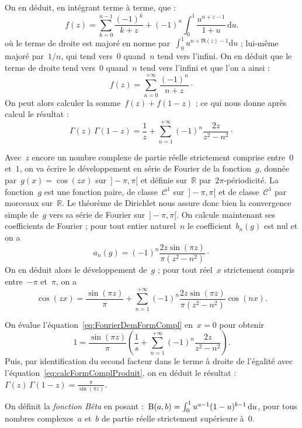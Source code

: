 \begin{dem}
			On en déduit, en intégrant terme à terme, que :
			\[
				f(z) = \sum_{k=0}^{n-1} \frac{(-1)^k}{k+z} + 
							(-1)^n\int_{0}^{1} \frac{u^{n+z-1}}{1+u}\,\mathrm{d}u.
			\]
			où le terme de droite est majoré en norme par~$\int_{0}^{1}u^{n+\Re(z)-1}\mathrm{d}u$ ; lui-même majoré par~$1/n$, qui tend vers~$0$ quand~$n$ tend vers l'infini. On en déduit que le terme de droite tend vers~$0$ quand~$n$ tend vers l'infini et que l'on a ainsi :
			\[
				f(z) = \sum_{n=0}^{+\infty} \frac{(-1)^n}{n+z}\cdot
			\]
			On peut alors calculer la somme~$f(z)+f(1-z)$ ; ce qui nous donne après calcul le résultat :
			\begin{equation}	\label{eq:calcFormComplProduit}
				\Gamma(z)\,\Gamma(1-z) = \frac{1}{z} + \sum_{n=1}^{+\infty} (-1)^n\frac{2 z}{z^2-n^2}\cdot
			\end{equation}
			
			 Avec~$z$ encore un nombre complexe de partie réelle strictement comprise entre~$0$ et~$1$, on va écrire le développement en série de Fourier de la fonction~$g$, donnée par~$g(x)=\cos(zx)$ sur~$]-\pi,\pi[$ et définie sur~$\mathbb{R}$ par~$2\pi$-périodicité. La fonction~$g$ est une fonction paire, de classe~$\mathscr{C}^1$ sur~$]-\pi,\pi[$ et de classe~$\mathscr{C}^1$ par morceaux sur~$\mathbb{R}$. Le théorème de Dirichlet nous assure donc bien la convergence simple de~$g$ vers sa série de Fourier sur~$]-\pi,\pi[$. On calcule maintenant ses coefficients de Fourier ; pour tout entier naturel~$n$ le coefficient~$b_n(g)$ est nul et on a 
			\[
				a_n(g) = (-1)^n\frac{2z\sin(\pi z)}{\pi(z^2-n^2)}\cdot
			\]
			On en déduit alors le développement de~$g$ ; pour tout réel~$x$ strictement compris entre~$-\pi$ et~$\pi$, on a 
			\begin{equation}	\label{eq:FourierDemFormCompl}
				\cos(zx) = \frac{\sin(\pi z)}{\pi} + \sum_{n=1}^{+\infty} (-1)^n \frac{2z\sin(\pi z)}{\pi(z^2-n^2)}\cos(nx).
			\end{equation}
			
			On évalue l'équation~\eqref{eq:FourierDemFormCompl} en~$x=0$ pour obtenir
			\[
				1 = \frac{\sin(\pi z)}{\pi} \left(\frac{1}{s} + \sum_{n=1}^{+\infty}(-1)^n \frac{2z}{z^2-n^2}\right).
			\]
			Puis, par identification du second facteur dans le terme à droite de l'égalité avec l'équation~\eqref{eq:calcFormComplProduit}, on en déduit le résultat :~$\Gamma(z)\,\Gamma(1-z)=\frac{\pi}{\sin(\pi z)}$.
		\end{dem}
		\begin{defi}
			On définit la \emph{fonction Bêta} en posant :~$\operatorname{B}(a,b)=\int_{0}^{1}u^{a-1}(1-u)^{b-1}\,\mathrm{d}u$, pour tous nombres complexes~$a$ et~$b$ de partie réelle strictement supérieure à~$0$.
		\end{defi}

